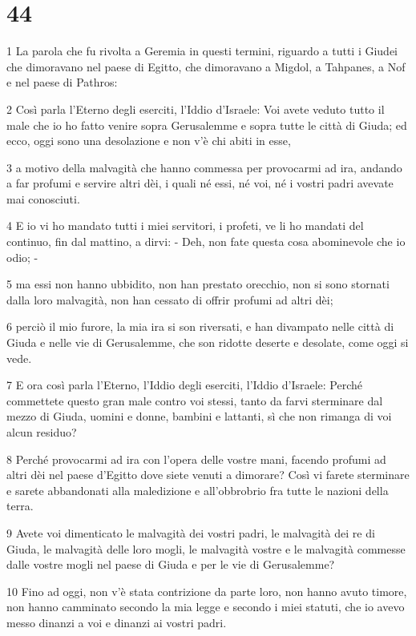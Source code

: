 \chapter{44}

\par 1 La parola che fu rivolta a Geremia in questi termini, riguardo a tutti i Giudei che dimoravano nel paese di Egitto, che dimoravano a Migdol, a Tahpanes, a Nof e nel paese di Pathros:
\par 2 Così parla l'Eterno degli eserciti, l'Iddio d'Israele: Voi avete veduto tutto il male che io ho fatto venire sopra Gerusalemme e sopra tutte le città di Giuda; ed ecco, oggi sono una desolazione e non v'è chi abiti in esse,
\par 3 a motivo della malvagità che hanno commessa per provocarmi ad ira, andando a far profumi e servire altri dèi, i quali né essi, né voi, né i vostri padri avevate mai conosciuti.
\par 4 E io vi ho mandato tutti i miei servitori, i profeti, ve li ho mandati del continuo, fin dal mattino, a dirvi: - Deh, non fate questa cosa abominevole che io odio; -
\par 5 ma essi non hanno ubbidito, non han prestato orecchio, non si sono stornati dalla loro malvagità, non han cessato di offrir profumi ad altri dèi;
\par 6 perciò il mio furore, la mia ira si son riversati, e han divampato nelle città di Giuda e nelle vie di Gerusalemme, che son ridotte deserte e desolate, come oggi si vede.
\par 7 E ora così parla l'Eterno, l'Iddio degli eserciti, l'Iddio d'Israele: Perché commettete questo gran male contro voi stessi, tanto da farvi sterminare dal mezzo di Giuda, uomini e donne, bambini e lattanti, sì che non rimanga di voi alcun residuo?
\par 8 Perché provocarmi ad ira con l'opera delle vostre mani, facendo profumi ad altri dèi nel paese d'Egitto dove siete venuti a dimorare? Così vi farete sterminare e sarete abbandonati alla maledizione e all'obbrobrio fra tutte le nazioni della terra.
\par 9 Avete voi dimenticato le malvagità dei vostri padri, le malvagità dei re di Giuda, le malvagità delle loro mogli, le malvagità vostre e le malvagità commesse dalle vostre mogli nel paese di Giuda e per le vie di Gerusalemme?
\par 10 Fino ad oggi, non v'è stata contrizione da parte loro, non hanno avuto timore, non hanno camminato secondo la mia legge e secondo i miei statuti, che io avevo messo dinanzi a voi e dinanzi ai vostri padri.

